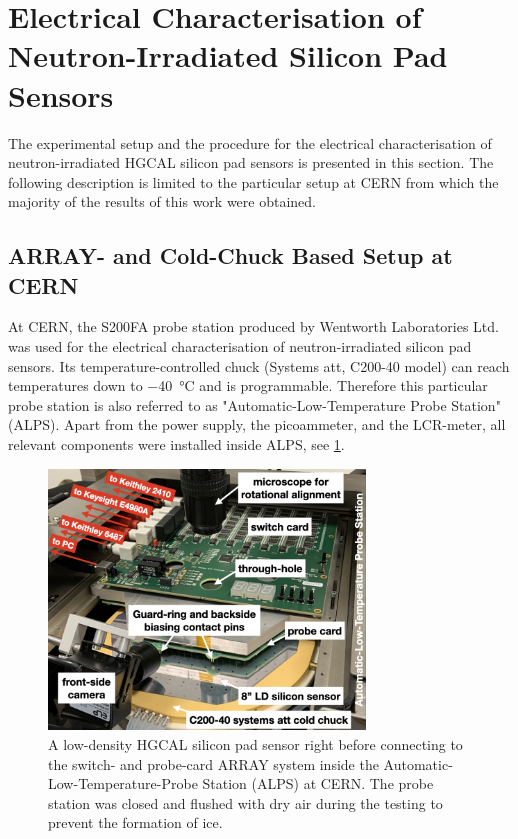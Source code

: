 \section{Electrical Characterisation of Neutron-Irradiated Silicon Pad Sensors}
\label{sec:setup}
The experimental setup and the procedure for the electrical characterisation of neutron-irradiated HGCAL silicon pad sensors is presented in this section.
The following description is limited to the particular setup at CERN from which the majority of the results of this work were obtained.

\subsection{ARRAY- and Cold-Chuck Based Setup at CERN}
\label{subsec:setup_alps}
At CERN, the S200FA probe station produced by Wentworth Laboratories Ltd. was used for the electrical characterisation of neutron-irradiated silicon pad sensors. 
Its temperature-controlled chuck (Systems att, C200-40 model) can reach temperatures down to \SI{-40}{\celsius} and is programmable.
Therefore this particular probe station is also referred to as "Automatic-Low-Temperature Probe Station" (ALPS).
Apart from the power supply, the picoammeter, and the LCR-meter, all relevant components were installed inside ALPS, see \ref{fig:ALPS_setup}.
\begin{figure}
	\centering
	\includegraphics[width=0.75\textwidth]{figures/ALPS_photo_edit.jpeg}
	\caption{
		A low-density HGCAL silicon pad sensor right before connecting to the switch- and probe-card ARRAY system inside the Automatic-Low-Temperature-Probe Station (ALPS) at CERN.
		The probe station was closed and flushed with dry air during the testing to prevent the formation of ice.
		}
		\label{fig:ALPS_setup}
	\end{figure}
